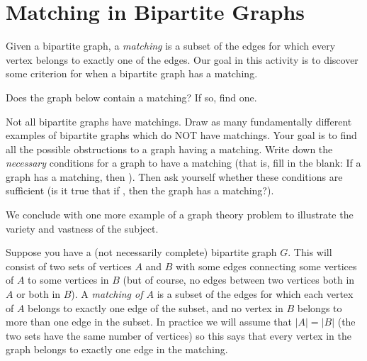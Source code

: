 \documentclass[12pt]{article}
\begin{document}
\section{Matching in Bipartite Graphs}

\begin{activity}
\noindent Given a bipartite graph, a {\em matching} is a subset of the edges for which every vertex belongs to exactly one of the edges.  Our goal in this activity is to discover some criterion for when a bipartite graph has a matching.

\begin{questions}
\question Does the graph below contain a matching?  If so, find one.

\begin{center}
\end{center}


\question Not all bipartite graphs have matchings.  Draw as many fundamentally different examples of bipartite graphs which do NOT have matchings.  Your goal is to find all the possible obstructions to a graph having a matching.  Write down the {\em necessary} conditions for a graph to have a matching (that is, fill in the blank: If a graph has a matching, then \underline{\hspace{1in}}).  Then ask yourself whether these conditions are sufficient (is it true that if \underline{\hspace{1in}}, then the graph has a matching?).




\end{questions}

\end{activity}


We conclude with one more example of a graph theory problem to illustrate the variety and vastness of the subject.

Suppose you have a (not necessarily complete) bipartite graph $G$.  This will consist of two sets of vertices $A$ and $B$ with some edges connecting some vertices of $A$ to some vertices in $B$ (but of course, no edges between two vertices both in $A$ or both in $B$).  A {\em matching of $A$} is a subset of the edges for which each vertex of $A$ belongs to exactly one edge of the subset, and no vertex in $B$ belongs to more than one edge in the subset.  In practice we will assume that $|A| = |B|$ (the two sets have the same number of vertices) so this says that every vertex in the graph belongs to exactly one edge in the matching.
\end{document}
